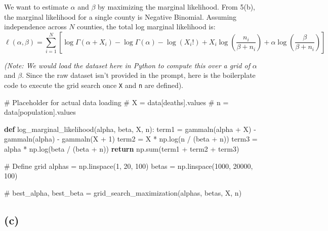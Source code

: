\documentclass[
  letterpaper,
  DIV=11,
  numbers=noendperiod]{scrartcl}
\newenvironment{Shaded}{\begin{snugshade}}{\end{snugshade}}
\newcommand{\BuiltInTok}[1]{\textcolor[rgb]{0.00,0.23,0.31}{#1}}
\newcommand{\CommentTok}[1]{\textcolor[rgb]{0.37,0.37,0.37}{#1}}
\newcommand{\ControlFlowTok}[1]{\textcolor[rgb]{0.00,0.23,0.31}{\textbf{#1}}}
\newcommand{\DecValTok}[1]{\textcolor[rgb]{0.68,0.00,0.00}{#1}}
\newcommand{\KeywordTok}[1]{\textcolor[rgb]{0.00,0.23,0.31}{\textbf{#1}}}
\newcommand{\NormalTok}[1]{\textcolor[rgb]{0.00,0.23,0.31}{#1}}
\newcommand{\OperatorTok}[1]{\textcolor[rgb]{0.37,0.37,0.37}{#1}}
\begin{document}
We want to estimate \(\alpha\) and \(\beta\) by maximizing the marginal
likelihood. From 5(b), the marginal likelihood for a single county is
Negative Binomial. Assuming independence across \(N\) counties, the
total log marginal likelihood is: \[
\ell(\alpha, \beta) = \sum_{i=1}^N \left[ \log \Gamma(\alpha + X_i) - \log \Gamma(\alpha) - \log(X_i!) + X_i \log\left(\frac{n_i}{\beta + n_i}\right) + \alpha \log\left(\frac{\beta}{\beta + n_i}\right) \right]
\]

\emph{(Note: We would load the dataset here in Python to compute this
over a grid of} \(\alpha\) and \(\beta\). Since the raw dataset isn't
provided in the prompt, here is the boilerplate code to execute the grid
search once \texttt{X} and \texttt{n} are defined).

\begin{Shaded}
\begin{Highlighting}[]
\CommentTok{\# Placeholder for actual data loading}
\CommentTok{\# X = data[\textquotesingle{}deaths\textquotesingle{}].values}
\CommentTok{\# n = data[\textquotesingle{}population\textquotesingle{}].values}

\KeywordTok{def}\NormalTok{ log\_marginal\_likelihood(alpha, beta, X, n):}
\NormalTok{    term1 }\OperatorTok{=}\NormalTok{ gammaln(alpha }\OperatorTok{+}\NormalTok{ X) }\OperatorTok{{-}}\NormalTok{ gammaln(alpha) }\OperatorTok{{-}}\NormalTok{ gammaln(X }\OperatorTok{+} \DecValTok{1}\NormalTok{)}
\NormalTok{    term2 }\OperatorTok{=}\NormalTok{ X }\OperatorTok{*}\NormalTok{ np.log(n }\OperatorTok{/}\NormalTok{ (beta }\OperatorTok{+}\NormalTok{ n))}
\NormalTok{    term3 }\OperatorTok{=}\NormalTok{ alpha }\OperatorTok{*}\NormalTok{ np.log(beta }\OperatorTok{/}\NormalTok{ (beta }\OperatorTok{+}\NormalTok{ n))}
    \ControlFlowTok{return}\NormalTok{ np.}\BuiltInTok{sum}\NormalTok{(term1 }\OperatorTok{+}\NormalTok{ term2 }\OperatorTok{+}\NormalTok{ term3)}

\CommentTok{\# Define grid}
\NormalTok{alphas }\OperatorTok{=}\NormalTok{ np.linspace(}\DecValTok{1}\NormalTok{, }\DecValTok{20}\NormalTok{, }\DecValTok{100}\NormalTok{)}
\NormalTok{betas }\OperatorTok{=}\NormalTok{ np.linspace(}\DecValTok{1000}\NormalTok{, }\DecValTok{20000}\NormalTok{, }\DecValTok{100}\NormalTok{)}

\CommentTok{\# best\_alpha, best\_beta = grid\_search\_maximization(alphas, betas, X, n)}
\end{Highlighting}
\end{Shaded}

\subsection{(c)}\label{c-3}
\end{document}
